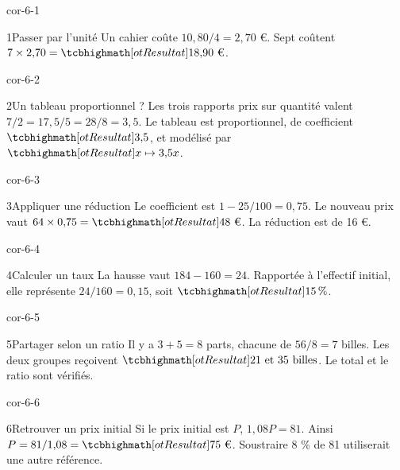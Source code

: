 \clearpage\pagestyle{otMain}\fontsize{11}{15}\selectfont{}
\begin{blocLivre}{cor-6-1}\begin{corrige}{1}{Passer par l’unité}
Un cahier coûte $10{,}80/4=2{,}70$ €. Sept coûtent $7\times2{,}70=\res{18{,}90\text{ €}}$.
\end{corrige}\end{blocLivre}
\begin{blocLivre}{cor-6-2}\begin{corrige}{2}{Un tableau proportionnel ?}
Les trois rapports prix sur quantité valent $7/2=17{,}5/5=28/8=3{,}5$. Le tableau est proportionnel, de coefficient $\res{3{,}5}$, et modélisé par $\res{x\mapsto3{,}5x}$.
\end{corrige}\end{blocLivre}
\begin{blocLivre}{cor-6-3}\begin{corrige}{3}{Appliquer une réduction}
Le coefficient est $1-25/100=0{,}75$. Le nouveau prix vaut $64\times0{,}75=\res{48\text{ €}}$. La réduction est de 16 €.
\end{corrige}\end{blocLivre}
\begin{blocLivre}{cor-6-4}\begin{corrige}{4}{Calculer un taux}
La hausse vaut $184-160=24$. Rapportée à l’effectif initial, elle représente $24/160=0{,}15$, soit $\res{15\,\%}$.
\end{corrige}\end{blocLivre}
\begin{blocLivre}{cor-6-5}\begin{corrige}{5}{Partager selon un ratio}
Il y a $3+5=8$ parts, chacune de $56/8=7$ billes. Les deux groupes reçoivent $\res{21\text{ et }35\text{ billes}}$. Le total et le ratio sont vérifiés.
\end{corrige}\end{blocLivre}
\begin{blocLivre}{cor-6-6}\begin{corrige}{6}{Retrouver un prix initial}
Si le prix initial est $P$, $1{,}08P=81$. Ainsi $P=81/1{,}08=\res{75\text{ €}}$. Soustraire 8 \% de 81 utiliserait une autre référence.
\end{corrige}\end{blocLivre}
